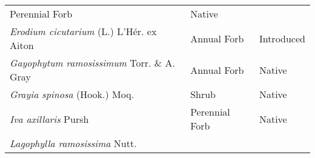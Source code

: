 \documentclass[8pt,]{article}
\begin{document}
\begin{longtable}[]{@{}lll@{}}
\begin{minipage}[t]{0.27\columnwidth}
Perennial Forb\strut
\end{minipage} & \begin{minipage}[t]{0.15\columnwidth}\raggedright\strut
Native\strut
\end{minipage}\tabularnewline
\begin{minipage}[t]{0.49\columnwidth}\raggedright\strut
\emph{Erodium cicutarium} (L.) L'Hér. ex Aiton\strut
\end{minipage} & \begin{minipage}[t]{0.27\columnwidth}\raggedright\strut
Annual Forb\strut
\end{minipage} & \begin{minipage}[t]{0.15\columnwidth}\raggedright\strut
Introduced\strut
\end{minipage}\tabularnewline
\begin{minipage}[t]{0.49\columnwidth}\raggedright\strut
\emph{Gayophytum ramosissimum} Torr. \& A. Gray\strut
\end{minipage} & \begin{minipage}[t]{0.27\columnwidth}\raggedright\strut
Annual Forb\strut
\end{minipage} & \begin{minipage}[t]{0.15\columnwidth}\raggedright\strut
Native\strut
\end{minipage}\tabularnewline
\begin{minipage}[t]{0.49\columnwidth}\raggedright\strut
\emph{Grayia spinosa} (Hook.) Moq.\strut
\end{minipage} & \begin{minipage}[t]{0.27\columnwidth}\raggedright\strut
Shrub\strut
\end{minipage} & \begin{minipage}[t]{0.15\columnwidth}\raggedright\strut
Native\strut
\end{minipage}\tabularnewline
\begin{minipage}[t]{0.49\columnwidth}\raggedright\strut
\emph{Iva axillaris} Pursh\strut
\end{minipage} & \begin{minipage}[t]{0.27\columnwidth}\raggedright\strut
Perennial Forb\strut
\end{minipage} & \begin{minipage}[t]{0.15\columnwidth}\raggedright\strut
Native\strut
\end{minipage}\tabularnewline
\begin{minipage}[t]{0.49\columnwidth}\raggedright\strut
\emph{Lagophylla ramosissima} Nutt.\strut
\end{minipage} & \begin{minipage}[t]{0.27\columnwidth}\raggedright\strut

\end{minipage}
\end{longtable}
\end{document}
